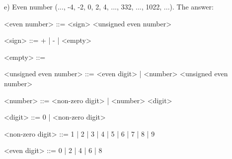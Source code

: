\documentclass{article}
\begin{document}
		e) Even number (..., -4, -2, 0, 2, 4, ..., 332, ..., 1022, ...). The answer:
		
	\ttfamily
	\begin{grammar}
	
		<even number> ::= <sign> <unsigned even number>
	
		<sign> ::= + | - | <empty>
	
		<empty> ::= \
	
		<unsigned even number> ::= <even digit> | <number> <unsigned even number>
	
		<number> ::= <non-zero digit> | <number> <digit>
	
		<digit> ::= 0 | <non-zero digit>
	
		<non-zero digit> ::= 1 | 2 | 3 | 4 | 5 | 6 | 7 | 8 | 9
	
		<even digit> ::= 0 | 2 | 4 | 6 | 8
	
			
	\end{grammar}
\end{document}
